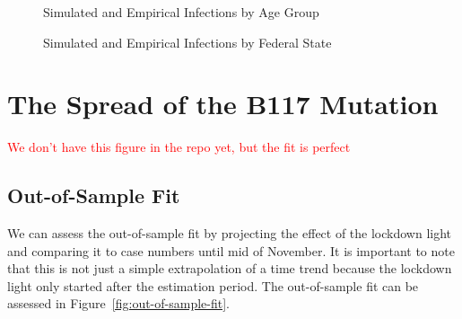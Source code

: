 \begin{figure}[ht]
\centering
\caption{Simulated and Empirical Infections by Age Group}
\label{fig:age_group_fit}
\end{figure}


\begin{figure}[ht]
\centering
\caption{Simulated and Empirical Infections by Federal State}
\label{fig:state_fit}
\end{figure}



\FloatBarrier


\section{The Spread of the B117 Mutation}


\textcolor{red}{We don't have this figure in the repo yet, but the fit is perfect}



\FloatBarrier

\subsection{Out-of-Sample Fit}
\label{sub:out_of_sample_fit}

We can assess the out-of-sample fit by projecting the effect of the lockdown light and
comparing it to case numbers until mid of November. It is important to note that this is
not just a simple extrapolation of a time trend because the lockdown light only started
after the estimation period. The out-of-sample fit can be assessed in
Figure~\ref{fig:out-of-sample-fit}.

